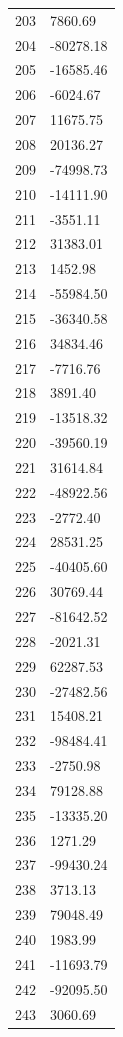 \documentclass[a4paper,11pt]{article}
\begin{document}
\begin{center}
\begin{longtable}{|R{1.5cm}|R{2.6cm}|}
  203 &      7860.69 \\
  204 &    -80278.18 \\
  205 &    -16585.46 \\
  206 &     -6024.67 \\
  207 &     11675.75 \\
  208 &     20136.27 \\
  209 &    -74998.73 \\
  210 &    -14111.90 \\
  211 &     -3551.11 \\
  212 &     31383.01 \\
  213 &      1452.98 \\
  214 &    -55984.50 \\
  215 &    -36340.58 \\
  216 &     34834.46 \\
  217 &     -7716.76 \\
  218 &      3891.40 \\
  219 &    -13518.32 \\
  220 &    -39560.19 \\
  221 &     31614.84 \\
  222 &    -48922.56 \\
  223 &     -2772.40 \\
  224 &     28531.25 \\
  225 &    -40405.60 \\
  226 &     30769.44 \\
  227 &    -81642.52 \\
  228 &     -2021.31 \\
  229 &     62287.53 \\
  230 &    -27482.56 \\
  231 &     15408.21 \\
  232 &    -98484.41 \\
  233 &     -2750.98 \\
  234 &     79128.88 \\
  235 &    -13335.20 \\
  236 &      1271.29 \\
  237 &    -99430.24 \\
  238 &      3713.13 \\
  239 &     79048.49 \\
  240 &      1983.99 \\
  241 &    -11693.79 \\
  242 &    -92095.50 \\
  243 &      3060.69 \\

\end{longtable}
\end{center}
\end{document}
